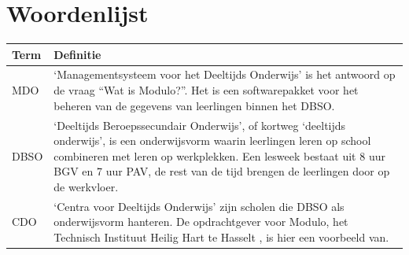 \documentclass[a4paper]{article}
\begin{document}
\section{Woordenlijst} %
\def\arraystretch{1.8}
\begin{tabularx}{\textwidth}{l | X}
    Term & Definitie \\
    \hline \hline
    MDO &`Managementsysteem voor het Deeltijds Onderwijs' is het antwoord op de vraag ``Wat is Modulo?''. Het is een softwarepakket voor het beheren van de gegevens van leerlingen binnen het DBSO. \\
    \hline
    DBSO & `Deeltijds Beroepssecundair Onderwijs', of kortweg `deeltijds onderwijs', is een onderwijsvorm waarin leerlingen leren op school combineren met leren op werkplekken. Een lesweek bestaat uit 8 uur BGV en 7 uur PAV, de rest van de tijd brengen de leerlingen door op de werkvloer. \cite{DBSO} \\
    \hline
    CDO & `Centra voor Deeltijds Onderwijs' zijn scholen die DBSO als onderwijsvorm hanteren. De opdrachtgever voor Modulo, het Technisch Instituut Heilig Hart te Hasselt \cite{TIHH}, is hier een voorbeeld van. \cite{CDO} \\
\end{tabularx}
\end{document}
